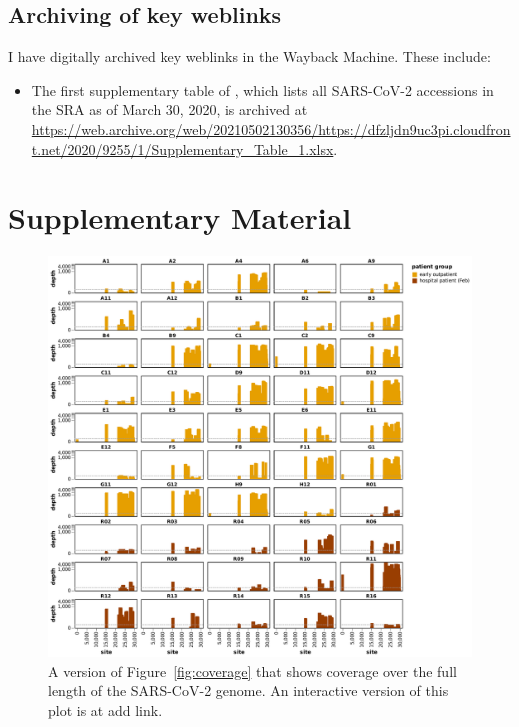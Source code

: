 \documentclass[9pt,twocolumn,twoside]{gsajnl_modified}
\begin{document}
\subsection{Archiving of key weblinks}
I have digitally archived key weblinks in the Wayback Machine.
These include:
\begin{itemize}
\item The first supplementary table of \citet{farkas2020insights}, which lists all SARS-CoV-2 accessions in the SRA as of March 30, 2020, is archived at \url{https://web.archive.org/web/20210502130356/https://dfzljdn9uc3pi.cloudfront.net/2020/9255/1/Supplementary_Table_1.xlsx}. 
\end{itemize}



\clearpage
\onecolumn
\renewcommand{\thepage}{S\arabic{page}}
\setcounter{page}{1}
\renewcommand{\thefigure}{S\arabic{figure}}
\setcounter{figure}{1}

\section{Supplementary Material}

\begin{figure}[h!]
\centering
\includegraphics[width=\linewidth]{figures/coverage_all.pdf}
\caption{A version of Figure~\ref{fig:coverage} that shows coverage over the full length of the SARS-CoV-2 genome.
An interactive version of this plot is at {\color{red} add link}.
}
\label{suppfig:coverage_all}
\end{figure}
\end{document}
